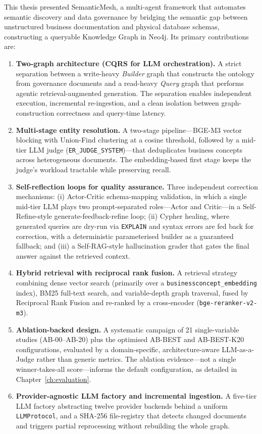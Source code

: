 This thesis presented SemanticMesh, a multi-agent framework that automates semantic discovery and data governance by bridging the semantic gap between unstructured business documentation and physical database schemas, constructing a queryable Knowledge Graph in Neo4j. Its primary contributions are:
\begin{enumerate}
    \item \textbf{Two-graph architecture (CQRS for LLM orchestration).} A strict separation between a write-heavy \emph{Builder} graph that constructs the ontology from governance documents and a read-heavy \emph{Query} graph that performs agentic retrieval-augmented generation. The separation enables independent execution, incremental re-ingestion, and a clean isolation between graph-construction correctness and query-time latency.
    \item \textbf{Multi-stage entity resolution.} A two-stage pipeline---BGE-M3 vector blocking with Union-Find clustering at a cosine threshold, followed by a mid-tier LLM judge (\texttt{ER\_JUDGE\_SYSTEM})---that deduplicates business concepts across heterogeneous documents. The embedding-based first stage keeps the judge's workload tractable while preserving recall.
    \item \textbf{Self-reflection loops for quality assurance.} Three independent correction mechanisms: (i) Actor-Critic schema-mapping validation, in which a single mid-tier LLM plays two prompt-separated roles---Actor and Critic---in a Self-Refine-style generate-feedback-refine loop; (ii) Cypher healing, where generated queries are dry-run via \texttt{EXPLAIN} and syntax errors are fed back for correction, with a deterministic parameterised builder as a guaranteed fallback; and (iii) a Self-RAG-style hallucination grader that gates the final answer against the retrieved context.
    \item \textbf{Hybrid retrieval with reciprocal rank fusion.} A retrieval strategy combining dense vector search (primarily over a \texttt{businessconcept\_embedding} index), BM25 full-text search, and variable-depth graph traversal, fused by Reciprocal Rank Fusion and re-ranked by a cross-encoder (\texttt{bge-reranker-v2-m3}).
    \item \textbf{Ablation-backed design.} A systematic campaign of 21 single-variable studies (AB-00--AB-20) plus the optimised AB-BEST and AB-BEST-K20 configurations, evaluated by a domain-specific, architecture-aware LLM-as-a-Judge rather than generic metrics. The ablation evidence---not a single winner-takes-all score---informs the default configuration, as detailed in Chapter~\ref{ch:evaluation}.
    \item \textbf{Provider-agnostic LLM factory and incremental ingestion.} A five-tier LLM factory abstracting twelve provider backends behind a uniform \texttt{LLMProtocol}, and a SHA-256 file-registry that detects changed documents and triggers partial reprocessing without rebuilding the whole graph.
\end{enumerate}

